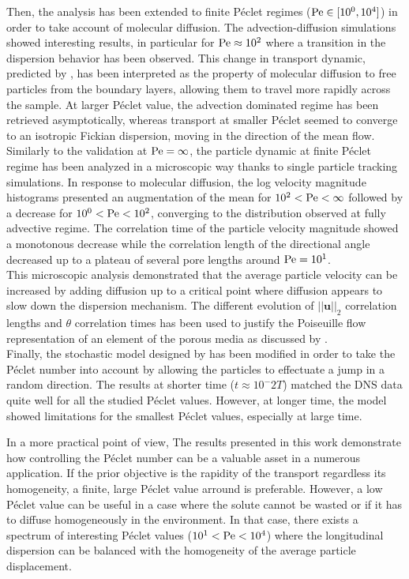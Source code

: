 Then, the analysis has been extended to finite Péclet regimes ($\mathrm{Pe}\in[10^0, 10^4]$) in order to take account of molecular diffusion.
The advection-diffusion simulations showed interesting results, in particular for $\mathrm{Pe}\approx 10^2$ where a transition in the dispersion behavior has been observed.
This change in transport dynamic, predicted by \citet{Meyer2016}, has been interpreted as the property of molecular diffusion to free particles from the boundary layers, allowing them to travel more rapidly across the sample.
At larger Péclet value, the advection dominated regime has been retrieved asymptotically, whereas transport at smaller Péclet seemed to converge to an isotropic Fickian dispersion, moving in the direction of the mean flow.\\
Similarly to the validation at $\mathrm{Pe} = \infty$, the particle dynamic at finite Péclet regime has been analyzed in a microscopic way thanks to single particle tracking simulations.
In response to molecular diffusion, the log velocity magnitude histograms presented an augmentation of the mean for $10^2<\mathrm{Pe}<\infty$ followed by a decrease for $10^0<\mathrm{Pe}<10^2$, converging to the distribution observed at fully advective regime.
The correlation time of the particle velocity magnitude showed a monotonous decrease while the correlation length of the directional angle decreased up to a plateau of several pore lengths around $\mathrm{Pe}=10^1$.\\
This microscopic analysis demonstrated that the average particle velocity can be increased by adding diffusion up to a critical point where diffusion appears to slow down the dispersion mechanism.
The different evolution of $||\textbf{u}||_2$ correlation lengths and $\theta$ correlation times has been used to justify the Poiseuille flow representation of an element of the porous media as discussed by \citet{Dentz2017}.\\

Finally, the stochastic model designed by \citet{Meyer2016} has been modified in order to take the Péclet number into account by allowing the particles to effectuate a jump in a random direction.
The results at shorter time ($t\approx10^-2 T$) matched the DNS data quite well for all the studied Péclet values.
However, at longer time, the model showed limitations for the smallest Péclet values, especially at large time.

In a more practical point of view, The results presented in this work demonstrate how controlling the Péclet number can be a valuable asset in a numerous application. 
If the prior objective is the rapidity of the transport regardless its homogeneity, a finite, large Péclet value arround is preferable. 
However, a low Péclet value can be useful in a case where the solute cannot be wasted or if it has to diffuse homogeneously in the environment.
In that case, there exists a spectrum of interesting Péclet values ($10^1<\mathrm{Pe}<10^4$) where the longitudinal dispersion can be balanced with the homogeneity of the average particle displacement.

